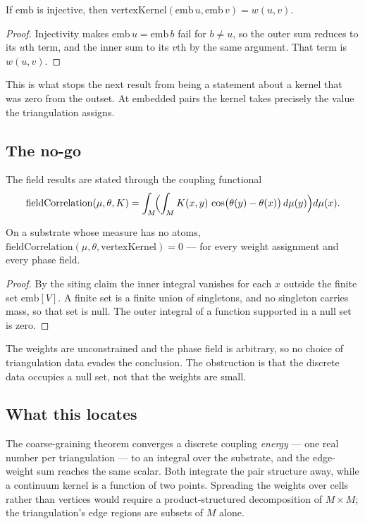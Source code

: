 \begin{claim}
If $\mathrm{emb}$ is injective, then
$\mathrm{vertexKernel}(\mathrm{emb}\,u,\mathrm{emb}\,v)=w(u,v)$.
\end{claim}
\begin{proof}
Injectivity makes $\mathrm{emb}\,u=\mathrm{emb}\,b$ fail for $b\neq u$, so the
outer sum reduces to its $u$th term, and the inner sum to its $v$th by the same
argument. That term is $w(u,v)$.
\end{proof}
\scope This is what stops the next result from being a statement about a kernel
that was zero from the outset. At embedded pairs the kernel takes precisely the
value the triangulation assigns.

\subsection{The no-go}
The field results are stated through the coupling functional
\[
  \mathrm{fieldCorrelation}(\mu,\theta,K)
    =\int_M\!\Bigl(\int_M K(x,y)\,\cos\bigl(\theta(y)-\theta(x)\bigr)\,d\mu(y)\Bigr)d\mu(x).
\]

\begin{claim}
On a substrate whose measure has no atoms,
$\mathrm{fieldCorrelation}(\mu,\theta,\mathrm{vertexKernel})=0$ --- for every
weight assignment and every phase field.
\end{claim}
\begin{proof}
By the siting claim the inner integral vanishes for each $x$ outside the finite
set $\mathrm{emb}[V]$. A finite set is a finite union of singletons, and no
singleton carries mass, so that set is null. The outer integral of a function
supported in a null set is zero.
\end{proof}
\scope The weights are unconstrained and the phase field is arbitrary, so no
choice of triangulation data evades the conclusion. The obstruction is that the
discrete data occupies a null set, not that the weights are small.

\subsection{What this locates}
The coarse-graining theorem converges a discrete coupling \emph{energy} --- one
real number per triangulation --- to an integral over the substrate, and the
edge-weight sum reaches the same scalar. Both integrate the pair structure away,
while a continuum kernel is a function of two points. Spreading the weights over
cells rather than vertices would require a product-structured decomposition of
$M\times M$; the triangulation's edge regions are subsets of $M$ alone.

